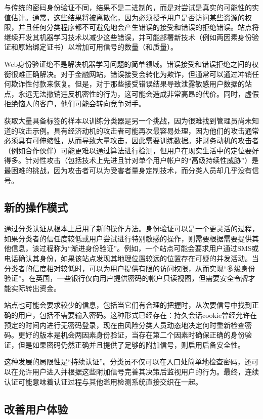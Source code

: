 与传统的密码身份验证不同，结果不是二进制的，而是对尝试是真实的可能性的实值估计。通常，这些结果将被离散化，因为必须授予用户是否访问某些资源的权限，并且任何分类程序都不可避免地会产生错误的接受和错误的拒绝错误。站点将继续开发其机器学习技术以减少这些错误，并可能部署新技术（例如两因素身份验证和原始绑定证书）以增加可用信号的数量（和质量）。

Web身份验证绝不是解决机器学习问题的简单领域。错误接受和错误拒绝之间的权衡很难正确解决。对于金融网站，错误接受会转化为欺诈，但通常可以通过冲销任何欺诈性付款来恢复。但是，对于那些接受错误结果导致泄露敏感用户数据的站点，永远无法撤销违反机密性的行为，这可能会造成非常高昂的代价。同时，虚假拒绝恼人的客户，他们可能会转向竞争对手。

获取大量具备标签的样本以训练分类器是另一个挑战，因为很难找到管理员尚未知道的攻击示例。具有经济动机的攻击者可能再次最容易处理，因为他们的攻击通常必须具有可伸缩性，从而导致大量攻击，因此需要训练数据。非财务动机的攻击者（例如合作伙伴）可能更难以通过算法进行检测，但用户在现实生活中的定位要好得多。针对性攻击（包括技术上先进且针对单个用户帐户的“高级持续性威胁”）是最困难的挑战，因为攻击者可以为受害者量身定制技术，而分类人员却几乎没有信号。

\subsection{新的操作模式}

通过分类认证从根本上启用了新的操作方法。身份验证可以是一个更灵活的过程，如果分类者的信任度较低或用户尝试进行特别敏感的操作，则需要根据需要提供其他信息，该过程称为“渐进身份验证”。例如，一个站点可能会要求用户通过SMS或电话确认其身份，如果该站点发现其地理位置较远的位置存在可疑的并发活动。当分类者的信度相对较低时，可以为用户提供有限的访问权限，从而实现“多级身份验证”。在英国，一些银行仅向用户提供密码的帐户只读视图，但需要安全令牌才能实际转出资金。

站点也可能会要求较少的信息，包括当它们有合理的把握时，从次要信号中找到正确的用户，包括不需要输入密码。这种形式已经存在：持久会话cookie曾经允许在预定的时间内进行无密码登录，现在由风险分类人员动态地决定何时重新检查密码。更好的版本是机会两因素身份验证，当存在第二个因素时确保正确的身份验证，但是如果密码仍然正确并且提供了足够的附加信号，则启用后备安全性。

这种发展的局限性是“持续认证”。分类员不仅可以在入口处简单地检查密码，还可以在允许用户进入并根据这些附加信号完善其决策后监视用户的行为。最终，连续认证可能意味着认证过程与其他滥用检测系统直接交织在一起。

\subsection{改善用户体验}


